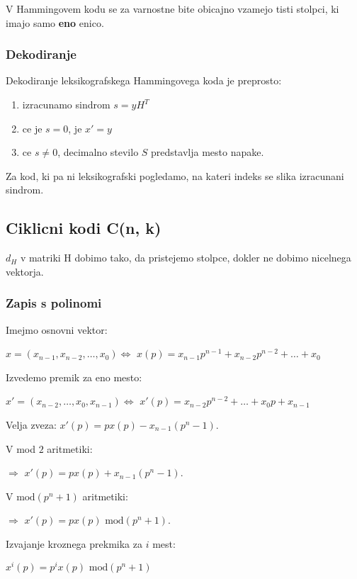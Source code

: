 \documentclass{article}
\begin{document}
\begin{multicols}{4}
 V Hammingovem kodu se za varnostne bite obicajno vzamejo tisti stolpci, ki imajo samo \textbf{eno} enico.

\subsubsection{Dekodiranje}
Dekodiranje leksikografskega Hammingovega koda je preprosto:
\begin{enumerate}
    \item izracunamo sindrom $s = yH^T$
    \item ce je $s = 0$, je $x' = y$
    \item ce $s \neq 0$, decimalno stevilo $S$ predstavlja mesto napake.
\end{enumerate}
Za kod, ki pa ni leksikografski pogledamo, na kateri indeks se slika izracunani sindrom.

\subsection{Ciklicni kodi C(n, k)}
$d_H$ v matriki H dobimo tako, da pristejemo stolpce, dokler ne dobimo nicelnega vektorja.

\subsubsection{Zapis s polinomi}
Imejmo osnovni vektor: 
\begin{center}
    $x = (x_{n-1}, x_{n-2}, \dots, x_0) \Leftrightarrow$
    $x(p) = x_{n-1}p^{n-1} + x_{n-2}p^{n-2} + \dots + x_0$ 
\end{center}
Izvedemo premik za eno mesto:
\begin{center}
    $x' = (x_{n-2}, \dots, x_0, x_{n-1}) \Leftrightarrow$
    $x'(p) = x_{n-2}p^{n-2} + \dots + x_0p + x_{n-1}$ 
\end{center}
Velja zveza: $x'(p) = px(p) - x_{n-1}(p^n -1)$.

V mod $2$ aritmetiki:
\begin{center}
    $\Rightarrow$ $x'(p) = px(p) + x_{n-1}(p^n -1)$.
\end{center}

V $\text{mod}(p^n + 1)$ aritmetiki:
\begin{center}
    $\Rightarrow$ $x'(p) = px(p) \text{ mod}(p^n + 1)$.
\end{center}

Izvajanje kroznega prekmika za $i$ mest:
\begin{center}
    \begin{math}
        x^i(p) = p^i x(p) \text{ mod} (p^n + 1)
    \end{math}
\end{center}


\end{multicols}
\end{document}
